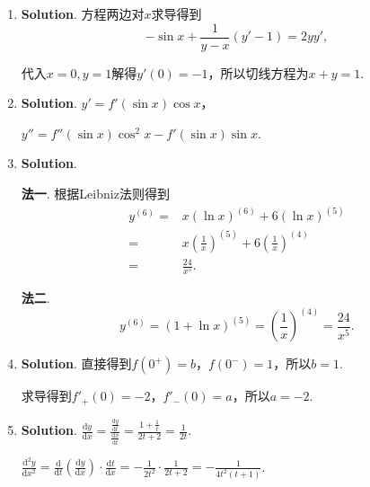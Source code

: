 \documentclass[../Main.tex]{subfiles}
\begin{document}
\begin{enumerate}
          代入$x=\frac{\pi}{4}$得$f'\left(\frac{\pi}{4}\right)=1+\frac{\pi}{2}\ln\frac{\pi}{4}$.

    \item \textbf{Solution}. 方程两边对$x$求导得到
          \[
              -\sin x+\frac{1}{y-x}(y'-1)=2yy',
          \]

          代入$x=0,y=1$解得$y'(0)=-1$，所以切线方程为$x+y=1$.

    \item \textbf{Solution}. $y'=f'(\sin x)\cos x$，

          $y''=f''(\sin x)\cos^{2} x-f'(\sin x)\sin x$.

    \item \textbf{Solution}.

          \textbf{法一}. 根据Leibniz法则得到
          \[
              \begin{aligned}
                  y^{(6)}= & x\left(\ln x\right)^{(6)}+6\left(\ln x\right)^{(5)}             \\
                  =        & x\left(\frac{1}{x}\right)^{(5)}+6\left(\frac{1}{x}\right)^{(4)} \\
                  =        & \frac{24}{x^5}.
              \end{aligned}
          \]

          \textbf{法二}.
          \[
              y^{(6)}=\left(1+\ln x\right)^{(5)}=\left(\frac{1}{x}\right)^{(4)}=\frac{24}{x^{5}}
              .
          \]

    \item \textbf{Solution}. 直接得到$f\left(0^{+}\right)=b$，$f\left(0^{-}\right
              )=1$，所以$b=1$.

          求导得到$f'_{+}(0)=-2$，$f'_{-}(0)=a$，所以$a=-2$.

    \item \textbf{Solution}. $\frac{\mathrm{d}y}{\mathrm{d}x}=\frac{\frac{\mathrm{d}y}{\mathrm{d}t}}{\frac{\mathrm{d}x}{\mathrm{d}t}}
              =\frac{1+\frac{1}{t}}{2t+2}=\frac{1}{2t}$.

          $\frac{\mathrm{d}^{2} y}{\mathrm{d}x^{2}}=\frac{\mathrm{d}}{\mathrm{d}t}\left
              (\frac{\mathrm{d}y}{\mathrm{d}x}\right)\cdot\frac{\mathrm{d}t}{\mathrm{d}x}
              =-\frac{1}{2t^{2}}\cdot\frac{1}{2t+2}=-\frac{1}{4t^{2}(t+1)}$.
\end{enumerate}
\end{document}
